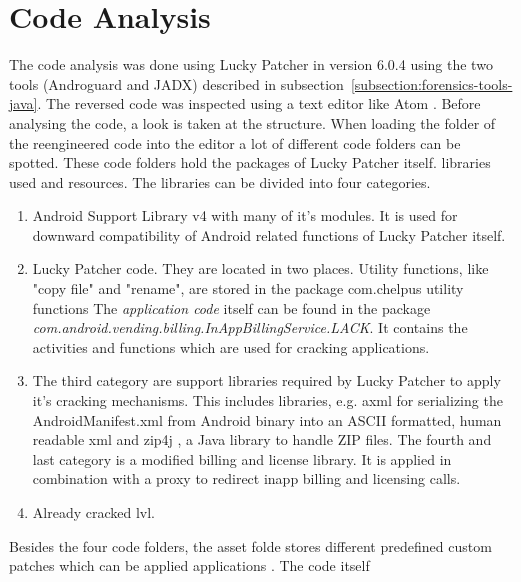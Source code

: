 \section{Code Analysis} \label{section:luckypatcher-analysis}
The code analysis was done using Lucky Patcher in version 6.0.4 using the two tools (Androguard and JADX) described in subsection~\ref{subsection:forensics-tools-java}.
The reversed code was inspected using a text editor like Atom \cite{atom}.
\newline
Before analysing the code, a look is taken at the structure.
When loading the folder of the reengineered code into the editor a lot of different code folders can be spotted.
These code folders hold the packages of Lucky Patcher itself. libraries used and resources.
The libraries can be divided into four categories.
\begin{enumerate}
\item Android Support Library v4 with many of it's modules.
It is used for downward compatibility of Android related functions of Lucky Patcher itself.
\item Lucky Patcher code.
They are located in two places.
Utility functions, like "copy file" and "rename", are stored in the package com.chelpus utility functions
The \textit{application code} itself can be found in the package \textit{com.android.vending.billing.InAppBillingService.LACK}.
It contains the activities and functions which are used for cracking applications.
\item The third category are support libraries required by Lucky Patcher to apply it's cracking mechanisms.
This includes libraries, e.g. axml \cite{axml} for serializing the AndroidManifest.xml from Android binary into an ASCII formatted, human readable xml and zip4j \cite{zip4j}, a Java library to handle ZIP files.
The fourth and last category is a modified billing and license library.
It is applied in combination with a proxy to redirect inapp billing and licensing calls.
\item Already cracked \gls{lvl}.
\end{enumerate}
Besides the four code folders, the asset folde stores different predefined custom patches which can be applied applications \cite{munteanLicense}.
\newline
The code itself
